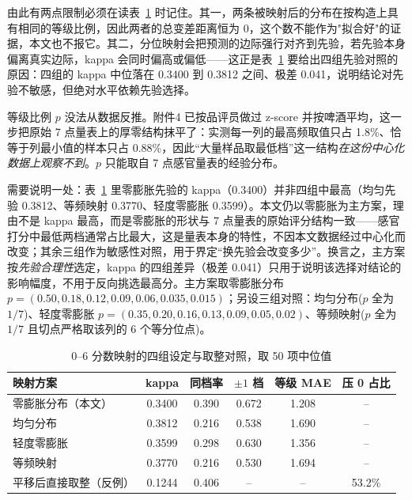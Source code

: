 由此有两点限制必须在读表~\ref{tab:q1grade} 时记住。其一，两条被映射后的分布在按构造上具有相同的等级比例，因此两者的总变差距离恒为 0，这个数不能作为"拟合好"的证据，本文也不报它。其二，分位映射会把预测的边际强行对齐到先验，若先验本身偏离真实边际，kappa 会同时偏高或偏低——这正是表~\ref{tab:q1grade} 要给出四组先验对照的原因：四组的 kappa 中位落在 0.3400 到 0.3812 之间、极差 0.041，说明结论对先验不敏感，但绝对水平依赖先验选择。

等级比例 $p$ 没法从数据反推。附件4 已按品评员做过 z-score 并按啤酒平均，这一步把原始 7 点量表上的厚零结构抹平了：实测每一列的最高频取值只占 1.8\%、恰等于列最小值的样本只占 0.88\%，因此“大量样品取最低档”这一结构\emph{在这份中心化数据上观察不到}。$p$ 只能取自 7 点感官量表的经验分布。

需要说明一处：表~\ref{tab:q1grade} 里零膨胀先验的 kappa（0.3400）并非四组中最高（均匀先验 0.3812、等频映射 0.3770、轻度零膨胀 0.3599）。本文仍以零膨胀为主方案，理由不是 kappa 最高，而是零膨胀的形状与 7 点量表的原始评分结构一致——感官打分中最低两档通常占比最大，这是量表本身的特性，不因本文数据经过中心化而改变；其余三组作为敏感性对照，用于界定“换先验会改变多少”。换言之，主方案按\emph{先验合理性}选定，kappa 的四组差异（极差 0.041）只用于说明该选择对结论的影响幅度，不用于反向挑选最高分。主方案取零膨胀分布 $p=(0.50,\allowbreak 0.18,\allowbreak 0.12,\allowbreak 0.09,\allowbreak 0.06,\allowbreak 0.035,\allowbreak 0.015)$；另设三组对照：均匀分布($p$ 全为 $1/7$)、轻度零膨胀 $p=(0.35,\allowbreak 0.20,\allowbreak 0.16,\allowbreak 0.13,\allowbreak 0.09,\allowbreak 0.05,\allowbreak 0.02)$、等频映射($p$ 全为 $1/7$ 且切点严格取该列的 6 个等分位点)。

\begin{table}[htbp]
\centering
\footnotesize
\caption{0--6 分数映射的四组设定与取整对照，取 50 项中位值}
\label{tab:q1grade}
\footnotesize
\setlength{\tabcolsep}{4.5pt}
\begin{tabular*}{\textwidth}{@{\extracolsep{\fill}}lccccc@{}}
\toprule
\textbf{映射方案} & \textbf{kappa} & \textbf{同档率} & \textbf{$\pm1$ 档} & \textbf{等级 MAE} & \textbf{压 0 占比} \\
\midrule
零膨胀分布（本文） & 0.3400 & 0.390 & 0.672 & 1.208 & -- \\
均匀分布 & 0.3812 & 0.216 & 0.538 & 1.690 & -- \\
轻度零膨胀 & 0.3599 & 0.298 & 0.630 & 1.356 & -- \\
等频映射 & 0.3770 & 0.216 & 0.530 & 1.694 & -- \\
\midrule
平移后直接取整（反例） & 0.1244 & 0.406 & -- & -- & 53.2\% \\
\bottomrule
\end{tabular*}
\end{table}


